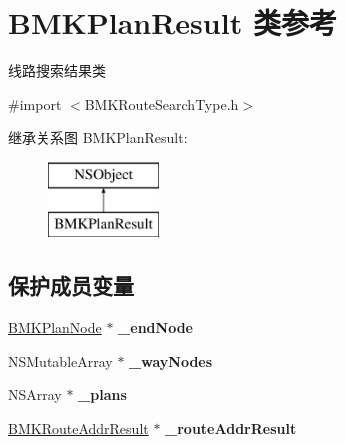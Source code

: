 \hypertarget{interface_b_m_k_plan_result}{\section{B\-M\-K\-Plan\-Result 类参考}
\label{interface_b_m_k_plan_result}
}


线路搜索结果类  




{\ttfamily \#import $<$B\-M\-K\-Route\-Search\-Type.\-h$>$}

继承关系图 B\-M\-K\-Plan\-Result\-:\begin{figure}[H]
\begin{center}
\leavevmode
\includegraphics[height=2.000000cm]{interface_b_m_k_plan_result}
\end{center}
\end{figure}
\subsection*{保护成员变量}
\begin{DoxyCompactItemize}
\item 
\hypertarget{interface_b_m_k_plan_result_ad029efb37721d67673dee83e894a1660}{\hyperlink{interface_b_m_k_plan_node}{B\-M\-K\-Plan\-Node} $\ast$ {\bfseries \-\_\-end\-Node}}\label{interface_b_m_k_plan_result_ad029efb37721d67673dee83e894a1660}

\item 
\hypertarget{interface_b_m_k_plan_result_adb7a3aef50ec81cdb1fc5fa65dba5307}{N\-S\-Mutable\-Array $\ast$ {\bfseries \-\_\-way\-Nodes}}\label{interface_b_m_k_plan_result_adb7a3aef50ec81cdb1fc5fa65dba5307}

\item 
\hypertarget{interface_b_m_k_plan_result_a19418a00649c6af7e825887e3c394ac5}{N\-S\-Array $\ast$ {\bfseries \-\_\-plans}}\label{interface_b_m_k_plan_result_a19418a00649c6af7e825887e3c394ac5}

\item 
\hypertarget{interface_b_m_k_plan_result_aeb12dd0ff148a881e268bbf90dc8c4e5}{\hyperlink{interface_b_m_k_route_addr_result}{B\-M\-K\-Route\-Addr\-Result} $\ast$ {\bfseries \-\_\-route\-Addr\-Result}}\label{interface_b_m_k_plan_result_aeb12dd0ff148a881e268bbf90dc8c4e5}

\end{DoxyCompactItemize}
